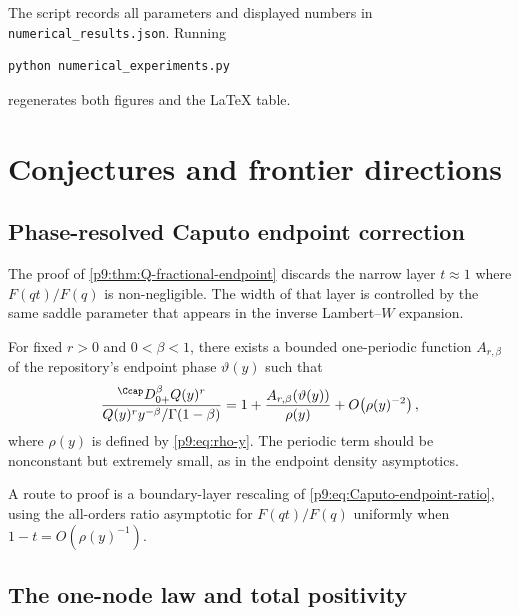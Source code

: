 \documentclass[11pt,oneside]{article}
\theoremstyle{definition}
\theoremstyle{remark}
\newcommand{\1}{\mathbf 1}
\begin{document}
The script records all parameters and displayed numbers in
\texttt{numerical\_results.json}.  Running
\begin{lstlisting}[style=code,language=bash]
python numerical_experiments.py
\end{lstlisting}
regenerates both figures and the LaTeX table.

\section{Conjectures and frontier directions}
\label{p9:sec:frontiers}

\subsection{Phase-resolved Caputo endpoint correction}

The proof of \cref{p9:thm:Q-fractional-endpoint} discards the narrow layer
$t\approx1$ where $F(qt)/F(q)$ is non-negligible.  The width of that layer is
controlled by the same saddle parameter that appears in the inverse
Lambert--$W$ expansion.

\begin{conjecture}
\label{p9:conj:Caputo-phase}
For fixed $r>0$ and $0<\beta<1$, there exists a bounded one-periodic function
$A_{r,\beta}$ of the repository's endpoint phase $\vartheta(y)$ such that
\begin{equation}
 \frac{{}^{\Ccap}D_{0+}^\beta Q(y)^r}
 {Q(y)^r y^{-\beta}/\Gamma(1-\beta)}
 =1+\frac{A_{r,\beta}(\vartheta(y))}{\rho(y)}
  +O\!\left(\rho(y)^{-2}\right),
 \label{p9:eq:Caputo-phase-conjecture}
\end{equation}
where $\rho(y)$ is defined by \cref{p9:eq:rho-y}.  The periodic term should be
nonconstant but extremely small, as in the endpoint density asymptotics.
\end{conjecture}

A route to proof is a boundary-layer rescaling of
\cref{p9:eq:Caputo-endpoint-ratio}, using the all-orders ratio asymptotic for
$F(qt)/F(q)$ uniformly when $1-t=O(\rho(y)^{-1})$.

\subsection{The one-node law and total positivity}
\end{document}
